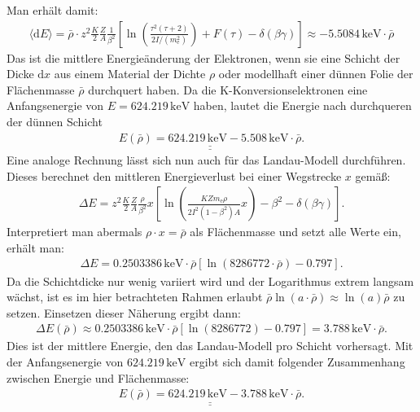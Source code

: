 \documentclass[german,  %
parskip=full,  %
]{scrartcl}
\begin{document}
Man erhält damit:
\begin{align*}
\langle \mathrm{d}E  \rangle = \bar{\rho}\cdot 
z^2 \frac{K}{2} \frac{Z}{A} \frac{1}{\beta^2} \left[ \ln \left(\frac{\tau^2(\tau+2)}{2I/(m_{\mathrm{e}}^2)}\right)+F(\tau)- \delta(\beta \gamma)\right] \approx -5.5084\,\mathrm{keV}\cdot \bar{\rho} 
\end{align*}
Das ist die mittlere Energieänderung der Elektronen, wenn sie eine Schicht der Dicke \(\mathrm{d}x\) aus einem Material der Dichte \(\rho\) oder modellhaft einer dünnen Folie der Flächenmasse \(\bar{\rho}\) durchquert haben. Da die K-Konversionselektronen eine Anfangsenergie von \(E=624.219\,\mathrm{keV}\) haben, lautet die Energie nach durchqueren der dünnen Schicht 
\begin{align*}
\underline{\underline{E(\bar{\rho}) = 624.219\,\mathrm{keV} - 5.508\,\mathrm{keV}\cdot \bar{\rho}}}.
\end{align*}
Eine analoge Rechnung lässt sich nun auch für das Landau-Modell durchführen. Dieses berechnet den mittleren Energieverlust bei einer Wegstrecke \(x\) gemäß:
\begin{align*}
\Delta E =z^2 \frac{K}{2} \frac{Z}{A} \frac{\rho}{\beta^2}x \left[ \ln \left(\frac{KZm_{\mathrm{e}}\rho}{2I^2(1-\beta^2)A}x\right)- \beta^2- \delta(\beta \gamma)\right].
\end{align*}
Interpretiert man abermals \(\rho\cdot x = \bar{\rho}\) als Flächenmasse und setzt alle Werte ein, erhält man:
\begin{align*}
\Delta E = 0.2503386\,\mathrm{keV}\cdot \bar{\rho}\left[\ln(8286772\cdot \bar{\rho}) - 0.797 \right].
\end{align*}
Da die Schichtdicke nur wenig variiert wird und der Logarithmus extrem langsam wächst, ist es im hier betrachteten Rahmen erlaubt \(\bar{\rho}\ln(a\cdot \bar{\rho})\approx \ln(a)\bar{\rho}\) zu setzen. Einsetzen dieser Näherung ergibt dann:
\begin{align*}
\Delta E(\bar{\rho}) \approx 0.2503386\,\mathrm{keV}\cdot \bar{\rho}\left[\ln(8286772) - 0.797 \right] = 3.788\,\mathrm{keV}\cdot \bar{\rho}.
\end{align*}
Dies ist der mittlere Energie, den das Landau-Modell pro Schicht vorhersagt. Mit der Anfangsenergie von \(624.219\,\mathrm{keV}\) ergibt sich damit folgender Zusammenhang zwischen Energie und Flächenmasse:
\begin{align*}
\underline{\underline{ E(\bar{\rho}) = 624.219\,\mathrm{keV} - 3.788\,\mathrm{keV}\cdot \bar{\rho}}}.
\end{align*}
\end{document}
